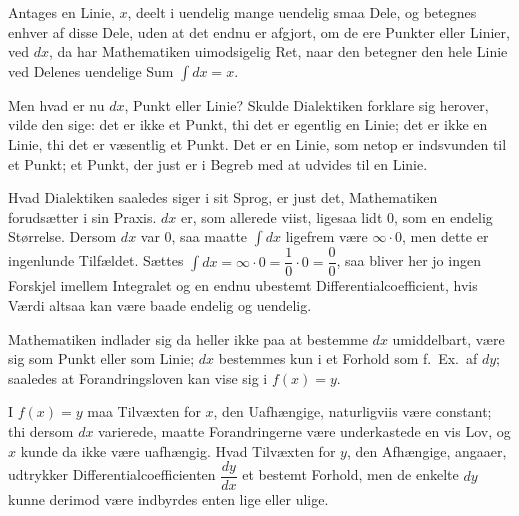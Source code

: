 \documentclass[12pt]{book}
\newcommand{\opage}[1]{\marginnote{\footnotesize\textit{[#1]}}}
\begin{document}
Antages en Linie, $x$, deelt i uendelig mange uendelig smaa Dele, og betegnes enhver
af disse Dele, uden at det endnu er afgjort, om de ere Punkter eller Linier, ved
$dx$, da har Mathematiken uimodsigelig Ret, naar den betegner den hele Linie ved
Delenes uendelige Sum $\int dx = x$.

Men hvad er nu $dx$, Punkt eller Linie? Skulde Dialektiken forklare sig herover,
vilde den sige: det er ikke et Punkt, thi det er egentlig en Linie; det er ikke en
Linie, thi det er væsentlig et Punkt. Det er en Linie, som netop er indsvunden til
et Punkt; et Punkt, der just er i Begreb med at udvides til en Linie.

Hvad Dialektiken saaledes siger i sit Sprog, er just det, Mathematiken forudsætter i
sin Praxis. $dx$ er, som allerede viist, ligesaa lidt 0, som en endelig Størrelse.
Dersom $dx$ var 0, saa maatte $\int dx$ ligefrem være $\infty\cdot 0$, men dette er
ingenlunde Tilfældet. Sættes
$\int dx = \infty\cdot 0 = \dfrac{1}{0}\cdot 0 = \dfrac{0}{0}$, saa bliver her jo
ingen Forskjel imellem Integralet og en endnu ubestemt Differentialcoefficient, hvis
Værdi altsaa kan være baade endelig og uendelig.

Mathematiken indlader sig da heller ikke paa at bestemme $dx$ umiddelbart, være sig
som Punkt eller som Linie;
\opage{68} $dx$ bestemmes kun i et Forhold som f.\ Ex.\ af $dy$; saaledes at Forandringsloven
kan vise sig i $f(x) = y$.

I $f(x) = y$ maa Tilvæxten for $x$, den Uafhængige, naturligviis være constant; thi
dersom $dx$ varierede, maatte Forandringerne være underkastede en vis Lov, og $x$
kunde da ikke være uafhængig. Hvad Tilvæxten for $y$, den Afhængige, angaaer,
udtrykker Differentialcoefficienten $\dfrac{dy}{dx}$ et bestemt Forhold, men de
enkelte $dy$ kunne derimod være indbyrdes enten lige eller ulige.

\begin{center}
\end{center}
\end{document}

